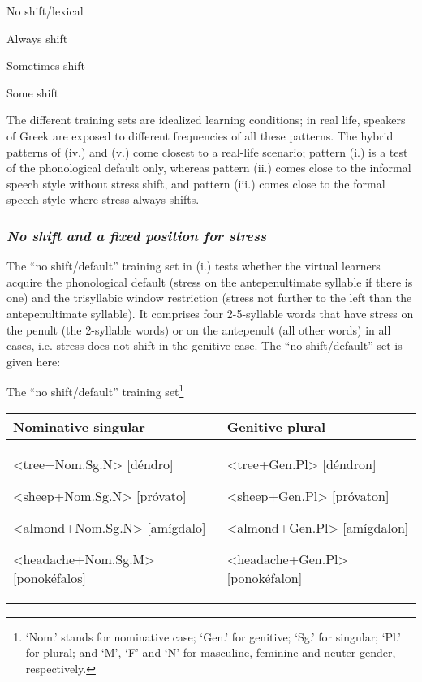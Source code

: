 \documentclass[a4paper]{article}
\begin{document}
{
No shift/lexical}

{
Always shift}

{
Sometimes shift}

{
Some shift}
\z

The different training sets are idealized learning conditions; in real life, speakers of Greek are exposed to different frequencies of all these patterns. The hybrid patterns of (iv.) and (v.) come closest to a real-life scenario; pattern (i.) is a test of the phonological default only, whereas pattern (ii.) comes close to the informal speech style without stress shift, and pattern (iii.) comes close to the formal speech style where stress always shifts.

\subsubsection{
\textit{No shift}\textit{ and a fixed position for stress}}

The “no shift/default” training set in (i.) tests whether the virtual learners acquire the phonological default (stress on the antepenultimate syllable if there is one) and the trisyllabic window restriction (stress not further to the left than the antepenultimate syllable).  It comprises four 2-5-syllable words that have stress on the penult (the 2-syllable words) or on the antepenult (all other words) in all cases, i.e. stress does not shift in the genitive case. The “no shift/default” set is given here:


\ea The “no shift/default” training set\footnote{ ‘Nom.’ stands for nominative case; ‘Gen.’ for genitive; ‘Sg.’ for singular; ‘Pl.’ for plural; and ‘M’, ‘F’ and ‘N’ for masculine, feminine and neuter gender, respectively.}

\begin{center}
\tablehead{}
\begin{supertabular}{m{2.68096in}|m{2.41706in}}
 Nominative singular &
 Genitive plural\\\hline
{ {\textless}tree+Nom.Sg.N{\textgreater} [déndro]\ \ }

{ {\textless}sheep+Nom.Sg.N{\textgreater} [próvato]}

{ {\textless}almond+Nom.Sg.N{\textgreater} [amígdalo]}

 {\textless}headache+Nom.Sg.M{\textgreater} [ponokéfalos] &
{ {\textless}tree+Gen.Pl{\textgreater} [déndron]\ \ }

{ {\textless}sheep+Gen.Pl{\textgreater} [próvaton]}

{ {\textless}almond+Gen.Pl{\textgreater} [amígdalon]}

 {\textless}headache+Gen.Pl{\textgreater} [ponokéfalon]\\
\end{supertabular}
\end{center}
\z
\end{document}
